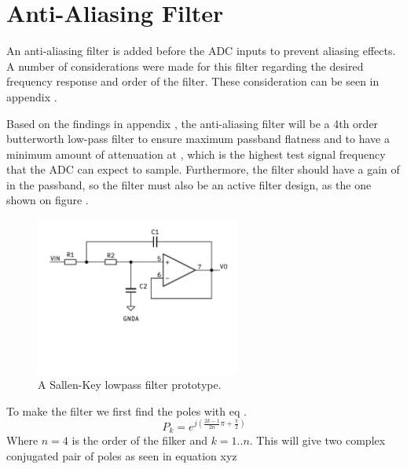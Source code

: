 \section{Anti-Aliasing Filter} \label{subsec:AAFilter}

An anti-aliasing filter is added before the ADC inputs to prevent aliasing effects. A number of considerations were made for this filter regarding the desired frequency response and order of the filter. These consideration can be seen in appendix .

Based on the findings in appendix , the anti-aliasing filter will be a 4th order butterworth low-pass filter to ensure maximum passband flatness and to have a minimum amount of attenuation at , which is the highest test signal frequency that the ADC can expect to sample. Furthermore, the filter should have a gain of  in the passband, so the filter must also be an active filter design, as the one shown on figure .

\begin{figure}[H]
    \centering
    \includegraphics[clip, trim=0 150 0 0, width=0.6\textwidth]{Sections/7_SystemDesign/Figures/7_1_4_AAF_SALLENKEY.pdf}
    \caption{A Sallen-Key lowpass filter prototype.}
    \label{fig_7_1_4_SALLENKEY}
\end{figure}

To make the filter we first find the poles with eq \cite{ANALOGFILTERS}.
\begin{equation}\label{eq:7_1_4_LPPoles}
    P_k = e^{j(\frac{2k-1}{2n}\pi + \frac{\pi}{2}  )} 
\end{equation}
Where $n = 4$ is the order of the filker and $k = 1..n$. This will give two complex conjugated pair of poles as seen in equation xyz

